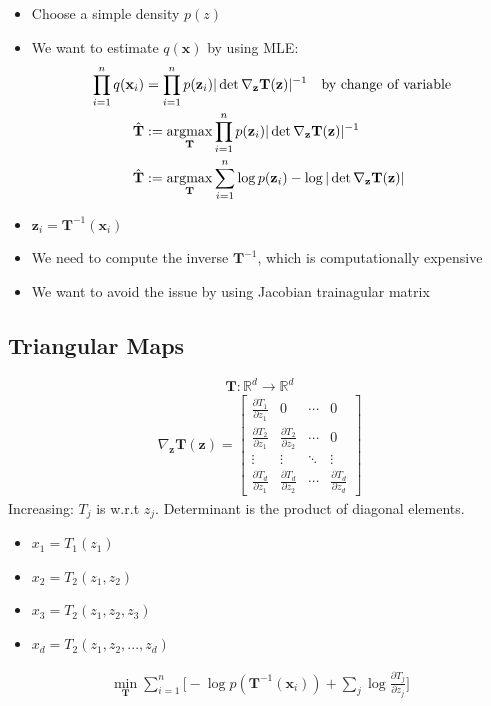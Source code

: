 \begin{itemize}
    \item Choose a simple density $p(z)$
	\item We want to estimate $q(\mathbf{x})$ by using MLE:
    \begin{align*}
        \prod_{i=1}^{n}q(\mathbf{x}_i) &= \prod_{i=1}^{n}p(\mathbf{z}_i)|\det \nabla_{\mathbf{z}}\mathbf{T}(\mathbf{z})|^{-1} \quad \textrm{by change of variable}\\
        \hat{\mathbf{T}} &:= \operatorname*{\operatorname{argmax}}_{\mathbf{T}}\prod_{i=1}^{n} p(\mathbf{z}_i)|\det \nabla_{\mathbf{z}}\mathbf{T}(\mathbf{z})|^{-1}\\
        \hat{\mathbf{T}} &:= \operatorname*{\operatorname{argmax}}_{\mathbf{T}}\sum_{i=1}^{n} \log p(\mathbf{z}_i) - \log |\det \nabla_{\mathbf{z}}\mathbf{T}(\mathbf{z})|
    \end{align*}
    \item $\mathbf{z}_i = \mathbf{T}^{-1}(\mathbf{x}_i)$
    \item We need to compute the inverse $\mathbf{T}^{-1}$, which is computationally expensive
    \item We want to avoid the issue by using Jacobian trainagular matrix 
\end{itemize}

\subsection{Triangular Maps}
$$\mathbf{T}: \mathbb{R}^d \rightarrow \mathbb{R}^d$$
\begin{align*}
    \nabla_{\mathbf{z}}\mathbf{T}(\mathbf{z})  = \begin{bmatrix}
    \frac{\partial T_1}{\partial z_1} & 0 &\cdots & 0\\
    \frac{\partial T_2}{\partial z_1} &\frac{\partial T_2}{\partial z_2} &\cdots & 0\\
    \vdots& \vdots &\ddots &\vdots\\
    \frac{\partial T_d}{\partial z_1} &\frac{\partial T_d}{\partial z_2} &\cdots &\frac{\partial T_d}{\partial z_d} 
 \end{bmatrix}
\end{align*}
Increasing: $T_j$ is w.r.t $z_j$. Determinant is the product of diagonal elements.
\begin{itemize}
    \item $x_1 = T_1(z_1)$
    \item $x_2 = T_2(z_1, z_2)$
    \item $x_3 = T_2(z_1, z_2, z_3)$
    \item $x_d = T_2(z_1, z_2, ..., z_d)$
\end{itemize}
\begin{align*}
    \min_{\mathbf{T}}\sum_{i=1}^{n} \Bigg[-\log p(\mathbf{T}^{-1}(\mathbf{x}_i)) + \sum_{j}\log \frac{\partial T_j}{\partial z_j}\Bigg] 
\end{align*}

